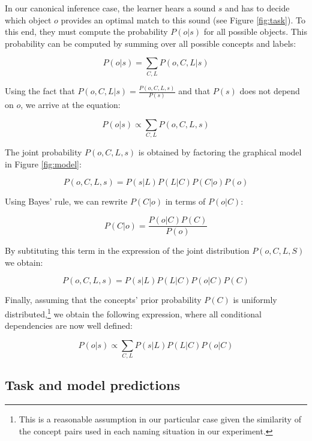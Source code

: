 \documentclass[english,,man]{apa6}
\let\rmarkdownfootnote\footnote%
\def\footnote{\protect\rmarkdownfootnote}
\begin{document}
In our canonical inference case, the learner hears a sound \(s\) and has to decide which object \(o\) provides an optimal match to this sound (see Figure \ref{fig:task}). To this end, they must compute the probability \(P(o|s)\) for all possible objects. This probability can be computed by summing over all possible concepts and labels:

\begin{equation}
P(o|s)=\sum_{C,L} P(o, C, L| s)  
\end{equation}

Using the fact that \(P(o,C,L|s) = \frac{P(o,C,L,s)}{P(s)}\) and that \(P(s)\) does not depend on \(o\), we arrive at the equation:

\begin{equation}
P(o|s) \propto \sum_{C,L} P(o, C, L, s) 
\end{equation}

The joint probability \(P(o,C,L,s)\) is obtained by factoring the graphical model in Figure \ref{fig:model}:

\[P(o,C,L,s) = P(s|L)P(L|C)P(C|o)P(o)\]

Using Bayes' rule, we can rewrite \(P(C|o)\) in terms of \(P(o|C)\):

\[P(C|o) = \frac{P(o|C)P(C)}{P(o)}\]

By subtituting this term in the expression of the joint distribution \(P(o,C,L,S)\) we obtain:

\[P(o,C,L,s) = P(s|L)P(L|C)P(o|C)P(C)\]

Finally, assuming that the concepts' prior probability \(P(C)\) is uniformly distributed,\footnote{This is a reasonable assumption in our particular case given the similarity of the concept pairs used in each naming situation in our experiment.} we obtain the following expression, where all conditional dependencies are now well defined:

\begin{equation} \label{eq:general}
P(o|s) \propto \sum_{C,L}  P(s|L)P(L|C)P(o|C)
\end{equation}

\hypertarget{task-and-model-predictions}{%
\subsection{Task and model predictions}\label{task-and-model-predictions}}
\end{document}
